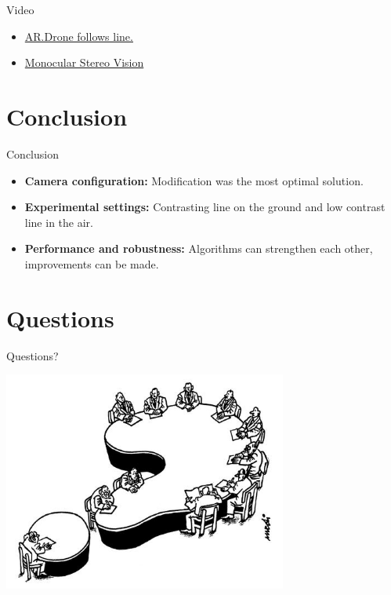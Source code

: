 \documentclass{beamer}
\begin{document}
\begin{frame}{}
\begin{block}{Video}
\begin{itemize}
\item \href{http://youtu.be/MmxhRnjHIv4}{AR.Drone follows line.}
\item \href{http://youtu.be/cSdcYHPiah4}{Monocular Stereo Vision}
\end{itemize}

\end{block}
\end{frame}


\section{Conclusion}
\begin{frame}
\begin{block}{Conclusion}
\begin{itemize}
\item \textbf{Camera configuration:} Modification was the most optimal solution.
\item \textbf{Experimental settings:} Contrasting line on the ground and low contrast line in the air.
\item \textbf{Performance and robustness:}  Algorithms can strengthen each other, improvements can be made.
\end{itemize}
\end{block}
\end{frame}



\section{Questions}
\begin{frame}{Questions?}
\begin{center}
\includegraphics[width = 0.7\textwidth]{images/questions.jpg}
\end{center}
\end{frame}
\end{document}
